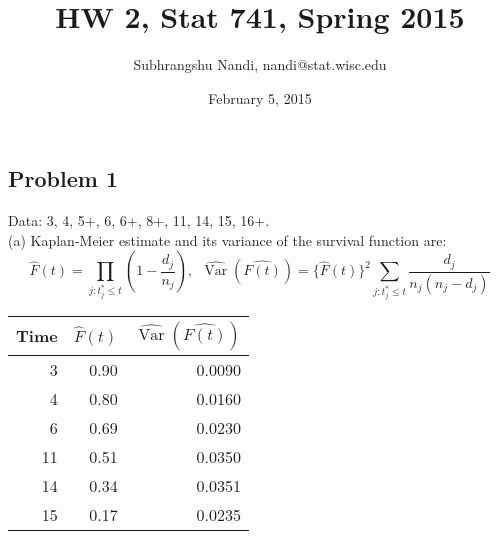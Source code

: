 \documentclass[11pt]{extarticle} %
\newcommand{\Var}{\operatorname{Var}}
\begin{document}

\title{HW 2, Stat 741, Spring 2015}
\author{Subhrangshu Nandi, nandi@stat.wisc.edu}
\date{February 5, 2015}

\maketitle

\subsection*{Problem 1}
\noindent
Data: 3, 4, 5+, 6, 6+, 8+, 11, 14, 15, 16+. \\
\noindent
(a) Kaplan-Meier estimate and its variance of the survival function are:
\[ \hat{F}(t) = \prod_{j: t_j^* \leq t} \left(1 - \frac{d_j}{n_j} \right),\ \ \hat{\Var}(\hat{F(t)})= \{\hat{F}(t)\}^2 \sum_{j: t_j^* \leq t} \frac{d_j}{n_j(n_j - d_j)} \]
\begin{table}[H]
\centering
\begin{tabular}{rrr}
  \hline
  Time & $\hat{F}(t)$ & $\hat{\Var}(\hat{F(t)})$ \\ 
  \hline
	3 & 0.90 & 0.0090 \\ 
	4 & 0.80 & 0.0160 \\ 
	6 & 0.69 & 0.0230 \\ 
	11 & 0.51 & 0.0350 \\ 
	14 & 0.34 & 0.0351 \\ 
	15 & 0.17 & 0.0235 \\ 
   \hline
\end{tabular}
\end{table}
\end{document}
